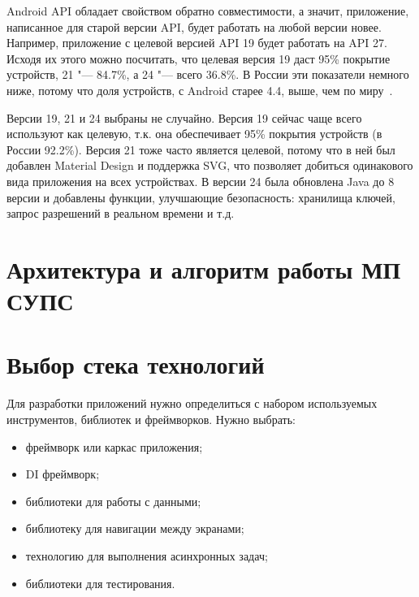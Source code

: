 Android API обладает свойством обратно совместимости, а значит, приложение, написанное для старой версии API, будет работать на любой версии новее.
Например, приложение с целевой версией API 19 будет работать на API 27.
Исходя их этого можно посчитать, что целевая версия 19 даст 95\% покрытие устройств, 21 "--- 84.7\%, а 24 "--- всего 36.8\%.
В России эти показатели немного ниже, потому что доля устройств, с Android старее 4.4, выше, чем по миру~\cite{statcounter:api}.

Версии 19, 21 и 24 выбраны не случайно.
Версия 19 сейчас чаще всего используют как целевую, т.к. она обеспечивает 95\% покрытия устройств (в России 92.2\%).
Версия 21 тоже часто является целевой, потому что в ней был добавлен Material Design и поддержка SVG, что позволяет добиться одинакового вида приложения на всех устройствах.
В версии 24 была обновлена Java до 8 версии и добавлены функции, улучшающие безопасность: хранилища ключей, запрос разрешений в реальном времени и т.д.


\section{Архитектура и алгоритм работы МП СУПС}
\label{sec:architecture}

\section{Выбор стека технологий}
\label{sec:stack}
Для разработки приложений нужно определиться с набором используемых инструментов, библиотек и фреймворков.
Нужно выбрать:
\begin{itemize}
  \item фреймворк или каркас приложения;
  \item DI фреймворк;
  \item библиотеки для работы с данными;
  \item библиотеку для навигации между экранами;
  \item технологию для выполнения асинхронных задач;
  \item библиотеки для тестирования.
\end{itemize}

